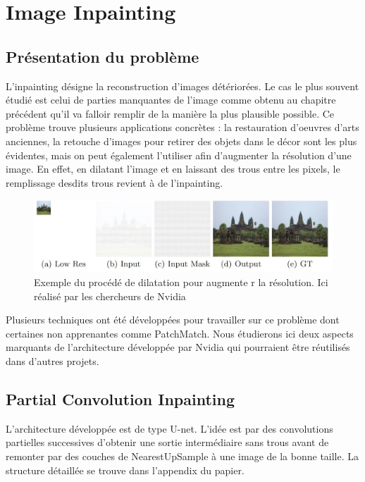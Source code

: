\chapter{Image Inpainting}

\section{Présentation du problème}

L'inpainting désigne la reconstruction d'images détériorées. Le cas le plus souvent étudié est celui de parties manquantes de l'image comme obtenu au chapitre précédent qu'il va falloir remplir de la manière la plus plausible possible.
Ce problème trouve plusieurs applications concrètes : la restauration d'oeuvres d'arts anciennes, la retouche d'images pour retirer des objets dans le décor sont les plus évidentes, mais on peut également l'utiliser afin d'augmenter la résolution d'une image. En effet, en dilatant l'image et en laissant des trous entre les pixels, le remplissage desdits trous revient à de l'inpainting.

\begin{figure}[!h]
    \centering
    \includegraphics[width= 400pt,valign=t]{"images/Image_inpainting/resolution"}
    \caption{Exemple du procédé de dilatation pour augmente r la résolution. Ici réalisé par les chercheurs de Nvidia \cite{Nvidia inpainting}}
\end{figure}

Plusieurs techniques ont été développées pour travailler sur ce problème dont certaines non apprenantes comme PatchMatch. Nous étudierons ici deux aspects marquants de l'architecture développée par Nvidia qui pourraient être réutilisés dans d'autres projets.\\
\section{Partial Convolution Inpainting}
L'architecture développée est de type U-net. L'idée est par des convolutions partielles successives d'obtenir une sortie intermédiaire sans trous avant de remonter par des couches de NearestUpSample à une image de la bonne taille. La structure détaillée se trouve dans l'appendix du papier. \cite{Nvidia inpainting}
